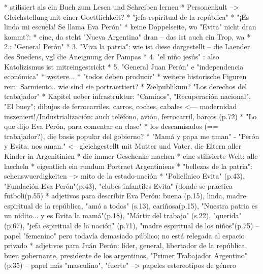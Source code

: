 * stilisiert als ein Buch zum Lesen und Schreiben lernen
* Personenkult --> Gleichstellung mit einer Goettlichkeit?
* "jefa espiritual de la república"
* "¡Es linda mi escuela! Se llama Eva Perón"
* keine Doppelseite, wo "Evita" nicht dran kommt?:
  * eine, da steht "Nueva Argentina" dran -- das ist auch ein Trop, wa
  * 2.: "General Perón"
  * 3. "Viva la patria": wie ist diese dargestellt -- die Laender des Suedens, vgl die Aneignung der Pampas
  * 4. "el niño jesús" : also Katolizismus ist mitreingestrickt
  * 5. "General Juan Perón" e "independencia económica"
  * weitere...
  * "todos deben producir"
  * weitere historische Figuren rein: Sarmiento.. wie sind sie portraertiert?
  * Zielpublikum? "Los derechos del trabajador"
  * Kapitel ueber infrastruktur: "Caminos", "Recuperación nacional", "El buey"; dibujos de ferrocarriles, carros, coches, cabales <--- modernidad inszeniert!/Industrialización: auch teléfono, avión, ferrocarril, barcos (p.72)
  * "Lo que dijo Eva Perón, para comentar en clase"
  * los descamisados (== trabajador?), die basis popular del gobierno?
* "Mamá y papa me aman" - "Perón y Evita, nos aman." <-- gleichgestellt mit Mutter und Vater, die Eltern aller Kinder in Argenitinien
* die immer Geschenke machen
* eine stilisierte Welt: alle laecheln
* eigentlich ein rundum Portraet Argentiniens
  * "bellezas de la patria": sehenswuerdigkeiten --> mito de la estado-nación
* "Policlínico Evita" (p.43), "Fundación Eva Perón"(p.43), "clubes infantiles Evita" (donde se practica futbol^^)(p.55)
* adjetivos para describir Eva Perón: buena (p.15), linda, madre espiritual de la república, "amó a todos" (s.13), cariñosa(p.15), "Nuestra patria es un nidito... y es Evita la mamá"(p.18), "Mártir del trabajo" (s.22), "querida" (p.67), "jefa espiritual de la nación" (p.71), "madre espiritual de los niños"(p.75)
-- papel "femenino" pero todavía demasiado público; no está relegada al espacio privado
* adjetivos para Juán Perón: líder, general, libertador de la república, buen gobernante, presidente de los argentinos, "Primer Trabajador Argentino"(p.35)
-- papel más "masculino", "fuerte"
--> papeles estereotípos de género
